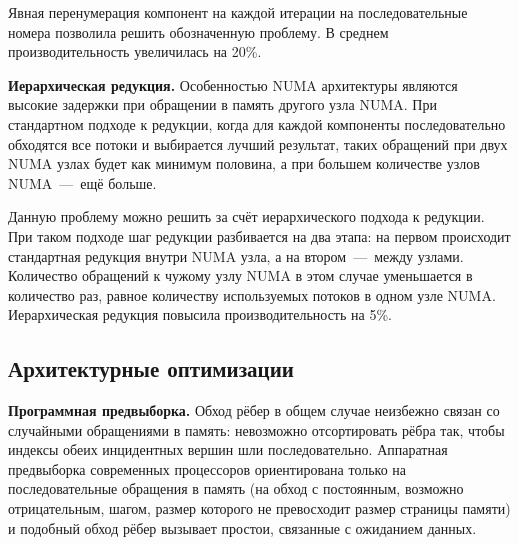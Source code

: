 \documentclass[a4paper,10pt]{extarticle}
\begin{document}
Явная перенумерация компонент на каждой итерации на последовательные номера позволила решить обозначенную проблему. В среднем производительность увеличилась на 20\%.


\textbf{Иерархическая редукция.}
Особенностью NUMA архитектуры являются высокие задержки при обращении в память другого узла NUMA.
При стандартном подходе к редукции, когда для каждой компоненты последовательно обходятся все потоки и выбирается лучший результат, таких обращений при двух NUMA узлах будет как минимум половина, а при большем количестве узлов NUMA~---~ещё больше. 

Данную проблему можно решить за счёт иерархического подхода к редукции. При таком подходе шаг редукции разбивается на два этапа: на первом происходит стандартная редукция внутри NUMA узла, а на втором~---~между узлами. Количество обращений к чужому узлу NUMA в этом случае уменьшается в количество раз, равное количеству используемых потоков в одном узле NUMA. Иерархическая редукция повысила производительность на 5\%.


\subsection{Архитектурные оптимизации}
\label{subsec:optArch}

\textbf{Программная предвыборка.}
Обход рёбер в общем случае неизбежно связан со случайными обращениями в память: невозможно отсортировать рёбра так, чтобы индексы обеих инцидентных вершин шли последовательно.
Аппаратная предвыборка современных процессоров ориентирована только на последовательные обращения в память (на обход с постоянным, возможно отрицательным, шагом, размер которого не превосходит размер страницы памяти) и подобный обход рёбер вызывает простои, связанные с ожиданием данных.
\end{document}
